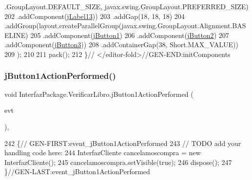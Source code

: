 \begin{DoxyCode}
      .GroupLayout.DEFAULT\_SIZE, javax.swing.GroupLayout.PREFERRED\_SIZE)
202                     .addComponent(\mbox{\hyperlink{class_interfaz_package_1_1_verificar_libro_a46332053f952c0ec6ca5dc7b744e135d}{jLabel13}}))
203                 .addGap(18, 18, 18)
204                 .addGroup(layout.createParallelGroup(javax.swing.GroupLayout.Alignment.BASELINE)
205                     .addComponent(\mbox{\hyperlink{class_interfaz_package_1_1_verificar_libro_a5795c2ef06a892f54b964cccdaa87bac}{jButton1}})
206                     .addComponent(\mbox{\hyperlink{class_interfaz_package_1_1_verificar_libro_a35a502b6b4c12dee0f50c5409271d275}{jButton2}})
207                     .addComponent(\mbox{\hyperlink{class_interfaz_package_1_1_verificar_libro_a71325c9a930cd968c2b6ce4abc7e8129}{jButton3}}))
208                 .addContainerGap(38, Short.MAX\_VALUE))
209         );
210 
211         pack();
212     \}\textcolor{comment}{// </editor-fold>//GEN-END:initComponents}
\end{DoxyCode}
\mbox{\label{class_interfaz_package_1_1_verificar_libro_a1e2ce8da1553133da46ea787b2e793c1}} 
\subsubsection{\texorpdfstring{j\+Button1\+Action\+Performed()}{jButton1ActionPerformed()}}
{\footnotesize\ttfamily void Interfaz\+Package.\+Verificar\+Libro.\+j\+Button1\+Action\+Performed (\begin{DoxyParamCaption}\item[{java.\+awt.\+event.\+Action\+Event}]{evt }\end{DoxyParamCaption})\hspace{0.3cm}{\ttfamily [inline]}, {\ttfamily [private]}}


\begin{DoxyCode}
242                                                                          \{\textcolor{comment}{//
      GEN-FIRST:event\_jButton1ActionPerformed}
243         \textcolor{comment}{// TODO add your handling code here:}
244         InterfazCliente cancelamoscompra = \textcolor{keyword}{new} InterfazCliente();
245         cancelamoscompra.setVisible(\textcolor{keyword}{true});
246         dispose();
247     \}\textcolor{comment}{//GEN-LAST:event\_jButton1ActionPerformed}
\end{DoxyCode}
\mbox{\label{class_interfaz_package_1_1_verificar_libro_a15b0fbfa1b64f9124a429e4ea8075241}} 
